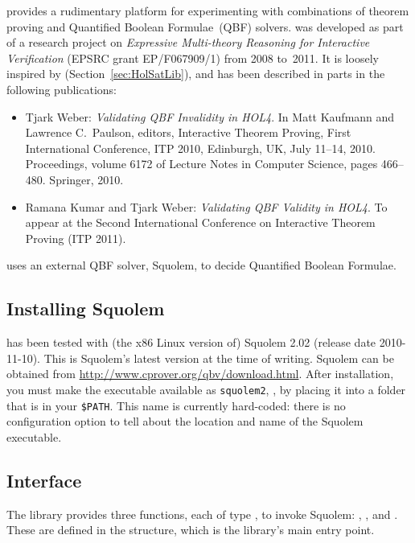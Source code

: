 
\setcounter{sessioncount}{0}

 provides a rudimentary platform for experimenting with
combinations of theorem proving and Quantified Boolean Formulae~(QBF)
solvers.   was developed as part of a research project
on {\it Expressive Multi-theory Reasoning for Interactive
  Verification} (EPSRC grant EP/F067909/1) from 2008 to~2011.  It is
loosely inspired by  (Section~\ref{sec:HolSatLib}), and
has been described in parts in the following publications:
\begin{itemize}
\item Tjark Weber: {\it Validating QBF Invalidity in HOL4}.  In Matt
  Kaufmann and Lawrence C.\ Paulson, editors, Interactive Theorem
  Proving, First International Conference, ITP 2010, Edinburgh, UK,
  July 11--14, 2010.  Proceedings, volume 6172 of Lecture Notes in
  Computer Science, pages 466--480.  Springer, 2010.
\item Ramana Kumar and Tjark Weber: {\it Validating QBF Validity in
  HOL4}.  To appear at the Second International Conference on
  Interactive Theorem Proving (ITP 2011).
\end{itemize}
 uses an external QBF solver, Squolem, to decide
Quantified Boolean Formulae.

\subsection{Installing Squolem}

 has been tested with (the x86 Linux version of) Squolem
2.02 (release date 2010-11-10).  This is Squolem's latest version at
the time of writing.  Squolem can be obtained from
\url{http://www.cprover.org/qbv/download.html}.  After installation,
you must make the executable available as {\tt squolem2}, \eg, by
placing it into a folder that is in your {\tt \$PATH}.  This name is
currently hard-coded: there is no configuration option to tell \HOL{}
about the location and name of the Squolem executable.

\subsection{Interface}
\label{qbf-interface}

The library provides three functions, each of type ,
to invoke Squolem: , , and .  These
are defined in the  structure, which is the library's
main entry point.

